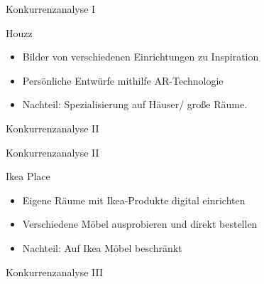 \documentclass[presentation,bigger,aspectratio=169]{beamer}
\begin{document}
\begin{frame}[label={sec:orgad2ea88}]{Konkurrenzanalyse I}
\begin{block}{Houzz}
\begin{itemize}
\item Bilder von verschiedenen Einrichtungen zu Inspiration
\item Persönliche Entwürfe mithilfe AR-Technologie
\item Nachteil: Spezialisierung auf Häuser/ große Räume.
\end{itemize}
\end{block}
\end{frame}
\begin{frame}[label={sec:org6fec50a}]{Konkurrenzanalyse II}
\end{frame}
\begin{frame}[label={sec:orgdf2dedf}]{Konkurrenzanalyse II}
\begin{block}{Ikea Place}
\begin{itemize}
\item Eigene Räume mit Ikea-Produkte digital einrichten
\item Verschiedene Möbel ausprobieren und direkt bestellen
\item Nachteil: Auf Ikea Möbel beschränkt
\end{itemize}
\end{block}
\end{frame}
\begin{frame}[label={sec:orgd83c24d}]{Konkurrenzanalyse III}
\end{frame}
\end{document}
